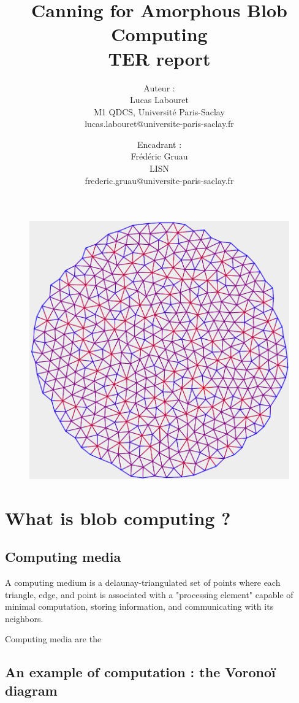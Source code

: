 \documentclass{article}
\title{
	Canning for Amorphous Blob Computing\\
	\small TER report
}
\author{
    Auteur :\\
    Lucas Labouret\\
    M1 QDCS, Université Paris-Saclay\\
    \small lucas.labouret@universite-paris-saclay.fr
    \and
    Encadrant :\\
    Frédéric Gruau\\
    LISN\\
    \small frederic.gruau@universite-paris-saclay.fr
}
\date{}
\begin{document}
 
\maketitle

\begin{figure}[H]
	\centering\includegraphics[width=0.9\linewidth]{assets/Circle500.png}
\end{figure}

\newpage
\tableofcontents
\newpage

\renewcommand{\thesection}{\Alph{section}}

\section{What is blob computing ?}

\subsection{Computing media}

A computing medium is a delaunay-triangulated set of points where each triangle, edge, and point is associated with a "processing element" capable of minimal computation, storing information, and communicating with its neighbors.

Computing media are the  

\subsection{An example of computation : the Voronoï diagram}
\end{document}
